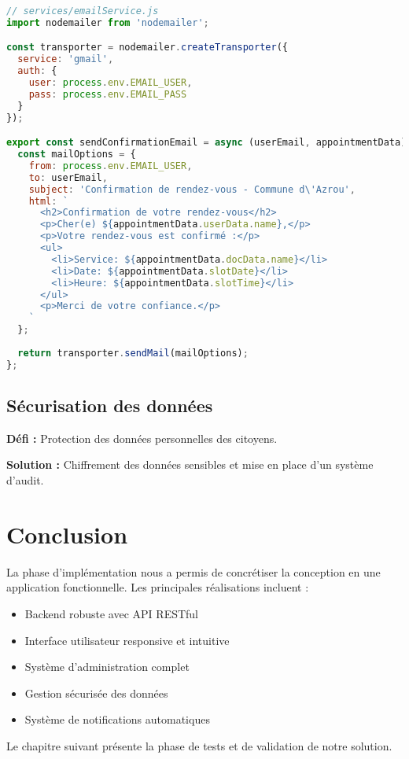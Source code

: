 \begin{lstlisting}[language=JavaScript, caption=Service de notification]
// services/emailService.js
import nodemailer from 'nodemailer';

const transporter = nodemailer.createTransporter({
  service: 'gmail',
  auth: {
    user: process.env.EMAIL_USER,
    pass: process.env.EMAIL_PASS
  }
});

export const sendConfirmationEmail = async (userEmail, appointmentData) => {
  const mailOptions = {
    from: process.env.EMAIL_USER,
    to: userEmail,
    subject: 'Confirmation de rendez-vous - Commune d\'Azrou',
    html: `
      <h2>Confirmation de votre rendez-vous</h2>
      <p>Cher(e) ${appointmentData.userData.name},</p>
      <p>Votre rendez-vous est confirmé :</p>
      <ul>
        <li>Service: ${appointmentData.docData.name}</li>
        <li>Date: ${appointmentData.slotDate}</li>
        <li>Heure: ${appointmentData.slotTime}</li>
      </ul>
      <p>Merci de votre confiance.</p>
    `
  };
  
  return transporter.sendMail(mailOptions);
};
\end{lstlisting}

\subsection{Sécurisation des données}

\textbf{Défi :} Protection des données personnelles des citoyens.

\textbf{Solution :} Chiffrement des données sensibles et mise en place d'un système d'audit.

\section{Conclusion}

La phase d'implémentation nous a permis de concrétiser la conception en une application fonctionnelle. Les principales réalisations incluent :

\begin{itemize}
    \item Backend robuste avec API RESTful
    \item Interface utilisateur responsive et intuitive
    \item Système d'administration complet
    \item Gestion sécurisée des données
    \item Système de notifications automatiques
\end{itemize}

Le chapitre suivant présente la phase de tests et de validation de notre solution.
